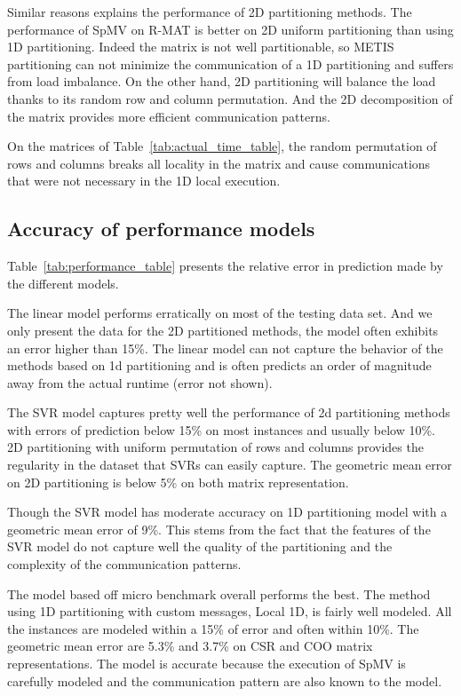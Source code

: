 \documentclass[sigconf,review,anonymous]{acmart}
\begin{document}
Similar reasons explains the performance of 2D partitioning methods.
The performance of SpMV on R-MAT is better on 2D uniform partitioning
than using 1D partitioning. Indeed the matrix is not well
partitionable, so METIS partitioning can not minimize the
communication of a 1D partitioning and suffers from load imbalance. On
the other hand, 2D partitioning will balance the load thanks to its
random row and column permutation. And the 2D decomposition of the
matrix provides more efficient communication patterns.

On the matrices of Table~\ref{tab:actual_time_table}, the random
permutation of rows and columns breaks all locality in the matrix and
cause communications that were not necessary in the 1D local
execution.

\subsection{Accuracy of performance models}

Table~\ref{tab:performance_table} presents the relative error in
prediction made by the different models.

The linear model performs erratically on most of the testing data
set. And we only present the data for the 2D partitioned methods, the
model often exhibits an error higher than 15\%. The linear model can
not capture the behavior of the methods based on 1d partitioning and
is often predicts an order of magnitude away from the actual runtime
(error not shown).

The SVR model captures pretty well the performance of 2d partitioning
methods with errors of prediction below 15\% on most instances and
usually below 10\%. 2D partitioning with uniform permutation of rows
and columns provides the regularity in the dataset that SVRs can
easily capture. The geometric mean error on 2D partitioning is below
5\% on both matrix representation.

Though the SVR model has moderate accuracy on 1D partitioning model
with a geometric mean error of 9\%. This stems from the fact that the
features of the SVR model do not capture well the quality of the
partitioning and the complexity of the communication patterns.

The model based off micro benchmark overall performs the best. The
method using 1D partitioning with custom messages, Local 1D, is fairly
well modeled. All the instances are modeled within a 15\% of error and
often within 10\%. The geometric mean error are 5.3\% and 3.7\% on CSR
and COO matrix representations. The model is accurate because the
execution of SpMV is carefully modeled and the communication pattern
are also known to the model.
\end{document}
